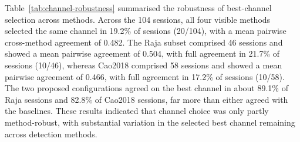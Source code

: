 Table~\ref{tab:channel-robustness} summarised the robustness of best-channel selection across methods. Across the 104 sessions, all four visible methods selected the same channel in 19.2\% of sessions (20/104), with a mean pairwise cross-method agreement of 0.482. The Raja subset comprised 46 sessions and showed a mean pairwise agreement of 0.504, with full agreement in 21.7\% of sessions (10/46), whereas Cao2018 comprised 58 sessions and showed a mean pairwise agreement of 0.466, with full agreement in 17.2\% of sessions (10/58). The two proposed configurations agreed on the best channel in about 89.1\% of Raja sessions and 82.8\% of Cao2018 sessions, far more than either agreed with the baselines. These results indicated that channel choice was only partly method-robust, with substantial variation in the selected best channel remaining across detection methods.
